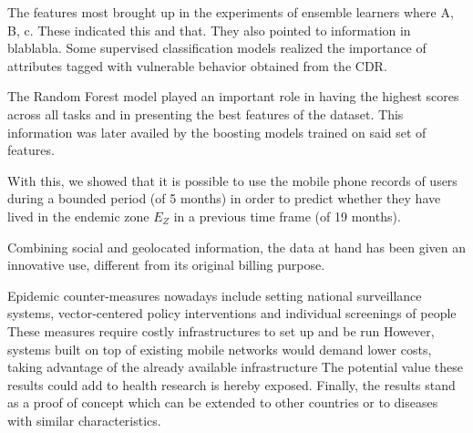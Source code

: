 The features most brought up in the experiments of ensemble learners where A, B, c.
These indicated this and that.
They also pointed to information in  blablabla.
Some supervised classification models realized the importance of attributes tagged with vulnerable behavior obtained from the CDR.\@

The Random Forest model played an important role in having the highest scores across all tasks and in presenting the best features of the dataset.
This information was later availed by the boosting models trained on said set of features.



With this, we showed that it is possible to use the mobile phone records of users during a bounded period (of 5 months) in order to predict whether they have lived in the endemic zone $E_Z$ in a previous time frame (of 19 months).

Combining social and geolocated information, the data at hand has been given an innovative use, different from its original billing purpose.




Epidemic counter-measures nowadays include setting national surveillance systems, vector-centered policy interventions and individual screenings of people
These measures require costly infrastructures to set up and be run
However, systems built on top of existing mobile networks would demand lower costs, taking advantage of the already available infrastructure
The potential value these results could add to health research is hereby exposed.
Finally, the results stand as a proof of concept which can be extended to other countries or to diseases with similar characteristics.


